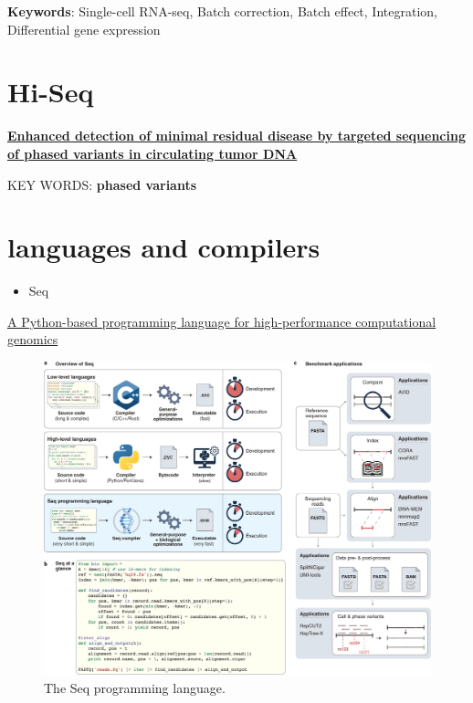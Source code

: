 \documentclass[
]{book}
\providecommand{\tightlist}{%
  \setlength{\itemsep}{0pt}\setlength{\parskip}{0pt}}
\begin{document}
\textbf{Keywords}: Single-cell RNA-seq, Batch correction, Batch effect, Integration, Differential gene expression

\hypertarget{hi-seq}{%
\section{Hi-Seq}\label{hi-seq}}

\textbf{\href{https://www.nature.com/articles/s41587-021-00981-w}{Enhanced detection of minimal residual disease by targeted sequencing of phased variants in circulating tumor DNA}\citep{Kurtz2021}}

KEY WORDS: \textbf{phased variants}

\hypertarget{languages-and-compilers}{%
\section{languages and compilers}\label{languages-and-compilers}}

\begin{itemize}
\tightlist
\item
  Seq
\end{itemize}

\href{https://www.nature.com/articles/s41587-021-00985-6}{A Python-based programming language for high-performance computational genomics}\citep{shajii2021python}

\begin{figure}
\centering
\includegraphics{./figs/computationalBio/The Seq programming language.jpg}
\caption{The Seq programming language.}
\end{figure}
\end{document}
